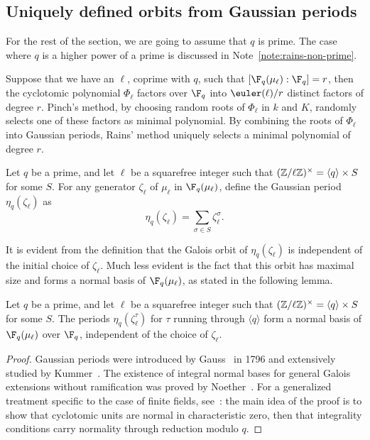 \subsection{Uniquely defined orbits from Gaussian periods}

For the rest of the section, we are going to assume that $q$ is
prime. The case where $q$ is a higher power of a prime is discussed in
Note~\ref{note:rains-non-prime}.

Suppose that we have an $\ell$, coprime with $q$, such that
$[\F_q(\mu_\ell):\F_q]=r$, then the cyclotomic polynomial $\Phi_\ell$
factors over $\F_q$ into $\euler(\ell)/r$ distinct factors of degree
$r$. Pinch's method, by choosing random roots of $\Phi_\ell$ in $k$
and $K$, randomly selects one of these factors as minimal polynomial.
By combining the roots of $\Phi_\ell$ into Gaussian periods, Rains'
method uniquely selects a minimal polynomial of degree $r$.

\begin{definition}
  Let $q$ be a prime, and let $\ell$ be a squarefree integer such that
  $(\mathbb{Z}/\ell\mathbb{Z})^\times = \langle q\rangle \times S$ for some $S$.  For any
  generator $\zeta_\ell$ of $\mu_\ell$ in $\F_q(\mu_\ell)$, define the
  Gaussian period $\eta_q(\zeta_\ell)$ as
  \begin{equation}
    \eta_q(\zeta_\ell) = \sum_{\sigma\in S}{\zeta_\ell^{\sigma}}.
  \end{equation}
\end{definition}

It is evident from the definition that the Galois orbit of
$\eta_q(\zeta_\ell)$ is independent of the initial choice of
$\zeta_\ell$. Much less evident is the fact that this orbit has
maximal size and forms a normal basis of $\F_q(\mu_\ell)$, as stated
in the following lemma.

\begin{lemma}
  \label{th:gaussian}
  Let $q$ be a prime, and let $\ell$ be a squarefree integer such that
  $(\mathbb{Z}/\ell\mathbb{Z})^\times = \langle q\rangle \times S$ for some $S$.  The
  periods $\eta_q(\zeta_\ell^\tau)$ for $\tau$ running through
  $\langle q\rangle$ form a normal basis of $\F_q(\mu_\ell)$ over
  $\F_q$, independent of the choice of $\zeta_\ell$.
\end{lemma}
\begin{proof}
  Gaussian periods were introduced by Gauss~\cite{gauss1986disquisitiones} in 1796 and extensively studied by Kummer~\cite{Kummer1846,Kummer1847a,Kummer1847b,Kummer1847c,Kummer1851,Kummer1855,Kummer1857}.
  The existence of integral normal bases for general Galois extensions without ramification was proved by Noether~\cite{Noether1932}.
  For a generalized treatment specific to the case of finite fields, see~\cite[Main Theorem]{feisel1999normal}:
  the main idea of the proof is to show that cyclotomic units are
  normal in characteristic zero, then that integrality conditions
  carry normality through reduction modulo $q$.
\end{proof}

